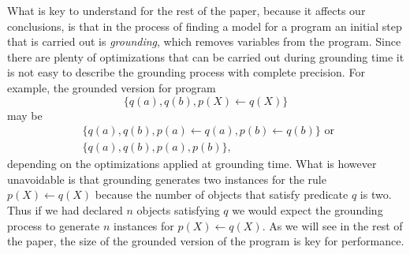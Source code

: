 What is key to understand for the rest of the paper, because it affects our conclusions, is that in the process of finding a model for a program an initial step that is carried out is \emph{grounding}, which removes variables from the program. Since there are plenty of optimizations that can be carried out during grounding time it is not easy to describe the grounding process with complete precision. For example, the grounded version for program 
\begin{equation}
    \{q(a),q(b),p(X)\leftarrow q(X)\}
\end{equation} may be  
\begin{align*}
&\{q(a),q(b),p(a)\leftarrow q(a),p(b)\leftarrow q(b)\} \text{ or } \\
&\{q(a),q(b),p(a),p(b)\},
\end{align*} 
depending on the optimizations applied at grounding time. What is however unavoidable is that grounding generates two instances for the rule $p(X)\leftarrow q(X)$ because the number of objects that satisfy predicate $q$ is two. Thus if we had declared $n$ objects satisfying $q$ we would expect the grounding process to generate $n$ instances for $p(X)\leftarrow q(X)$. As we will see in the rest of the paper, the size of the grounded version of the program is key for performance.
